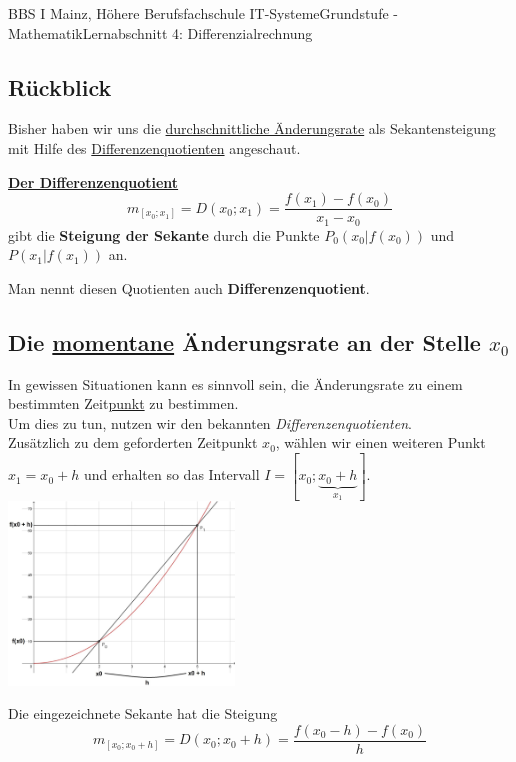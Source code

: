 \documentclass[11pt,twocolumn,oneside,openany,headings=optiontotoc,11pt,numbers=noenddot,final]{article}
\begin{document}
	\begin{worksheet}{BBS I Mainz, Höhere Berufsfachschule IT-Systeme}{Grundstufe - Mathematik}{Lernabschnitt 4: Differenzialrechnung}
		\setcounter{section}{7}
		\subsection*{Rückblick}
		Bisher haben wir uns die \underline{durchschnittliche Änderungsrate} als Sekantensteigung mit Hilfe des \underline{Differenzenquotienten} angeschaut.\\
		\begin{framed}
			\noindent
			\underline{\textbf{Der Differenzenquotient}}
			\[m_{[x_0;x_1]} = D(x_0;x_1) = \frac{f(x_1) - f(x_0)}{x_1 - x_0}\] gibt die \textbf{Steigung der Sekante} durch die Punkte \(P_0(x_0|f(x_0))\) und \(P(x_1|f(x_1))\) an.\\
			\par\noindent
			Man nennt diesen Quotienten auch \textbf{Differenzenquotient}.
		\end{framed}
		\subsection{Die \underline{momentane} Änderungsrate an der Stelle \(x_0\)}
		In gewissen Situationen kann es sinnvoll sein, die Änderungsrate zu einem bestimmten Zeit\underline{punkt} zu bestimmen.\\
		Um dies zu tun, nutzen wir den bekannten \textit{Differenzenquotienten}.\\
		Zusätzlich zu dem geforderten Zeitpunkt \(x_0\), wählen wir einen weiteren Punkt \(x_1 = x_0 + h\) und erhalten so das Intervall \(I = [x_0; \underbrace{x_0 + h}_{x_1}]\).\\
		\includegraphics[width=0.45\textwidth]{../99_Bilder/04_Skr_DiffQuo.jpg}\\
		\par\noindent
		Die eingezeichnete Sekante hat die Steigung
		\[m_{[x_0;x_0+h]} = D(x_0;x_0+h) = \frac{f(x_0-h) - f(x_0)}{h}\]
		

\end{worksheet}
\end{document}
